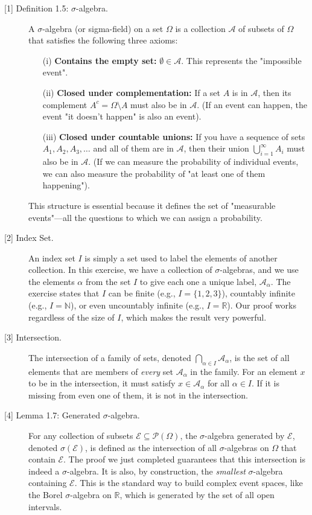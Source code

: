 \documentclass[11pt,a4paper]{article}
\theoremstyle{tutorstyle}
\newcommand{\powerset}{\mathcal{P}} %
\begin{document}
\begin{description}
    \item[\hypertarget{note1}{[1] Definition 1.5: $\sigma$-algebra.}] A $\sigma$-algebra (or sigma-field) on a set $\Omega$ is a collection $\mathcal{A}$ of subsets of $\Omega$ that satisfies the following three axioms:
    \begin{itemize}
        \item[(i)] \textbf{Contains the empty set:} $\emptyset \in \mathcal{A}$. This represents the "impossible event".
        \item[(ii)] \textbf{Closed under complementation:} If a set $A$ is in $\mathcal{A}$, then its complement $A^c = \Omega \setminus A$ must also be in $\mathcal{A}$. (If an event can happen, the event "it doesn't happen" is also an event).
        \item[(iii)] \textbf{Closed under countable unions:} If you have a sequence of sets $A_1, A_2, A_3, \dots$ and all of them are in $\mathcal{A}$, then their union $\bigcup_{i=1}^{\infty} A_i$ must also be in $\mathcal{A}$. (If we can measure the probability of individual events, we can also measure the probability of "at least one of them happening").
    \end{itemize}
    This structure is essential because it defines the set of "measurable events"—all the questions to which we can assign a probability.

    \item[\hypertarget{note2}{[2] Index Set.}] An index set $I$ is simply a set used to label the elements of another collection. In this exercise, we have a collection of $\sigma$-algebras, and we use the elements $\alpha$ from the set $I$ to give each one a unique label, $\mathcal{A}_\alpha$. The exercise states that $I$ can be finite (e.g., $I=\{1, 2, 3\}$), countably infinite (e.g., $I=\mathbb{N}$), or even uncountably infinite (e.g., $I=\mathbb{R}$). Our proof works regardless of the size of $I$, which makes the result very powerful.

    \item[\hypertarget{note3}{[3] Intersection.}] The intersection of a family of sets, denoted $\bigcap_{\alpha \in I} \mathcal{A}_\alpha$, is the set of all elements that are members of \emph{every} set $\mathcal{A}_\alpha$ in the family. For an element $x$ to be in the intersection, it must satisfy $x \in \mathcal{A}_\alpha$ for all $\alpha \in I$. If it is missing from even one of them, it is not in the intersection.

    \item[\hypertarget{note4}{[4] Lemma 1.7: Generated $\sigma$-algebra.}] For any collection of subsets $\mathcal{E} \subseteq \powerset(\Omega)$, the $\sigma$-algebra generated by $\mathcal{E}$, denoted $\sigma(\mathcal{E})$, is defined as the intersection of all $\sigma$-algebras on $\Omega$ that contain $\mathcal{E}$. The proof we just completed guarantees that this intersection is indeed a $\sigma$-algebra. It is also, by construction, the \emph{smallest} $\sigma$-algebra containing $\mathcal{E}$. This is the standard way to build complex event spaces, like the Borel $\sigma$-algebra on $\mathbb{R}$, which is generated by the set of all open intervals.
\end{description}
\end{document}
